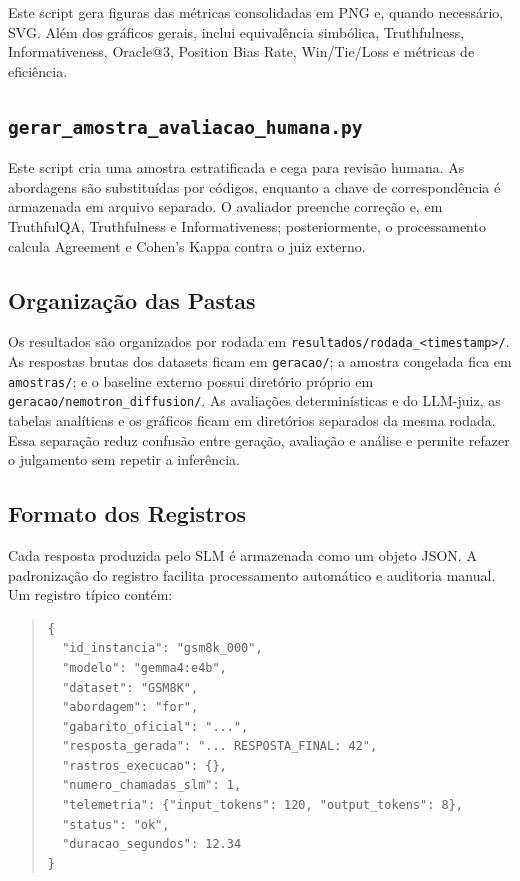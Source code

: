 \documentclass[12pt]{article}
\begin{document}
Este script gera figuras das métricas consolidadas em PNG e, quando necessário, SVG. Além dos gráficos gerais, inclui equivalência simbólica, Truthfulness, Informativeness, Oracle@3, Position Bias Rate, Win/Tie/Loss e métricas de eficiência.

\subsection{\texttt{gerar\_amostra\_avaliacao\_humana.py}}

Este script cria uma amostra estratificada e cega para revisão humana. As abordagens são substituídas por códigos, enquanto a chave de correspondência é armazenada em arquivo separado. O avaliador preenche correção e, em TruthfulQA, Truthfulness e Informativeness; posteriormente, o processamento calcula Agreement e Cohen's Kappa contra o juiz externo.

\subsection{Organização das Pastas}

Os resultados são organizados por rodada em \texttt{resultados/rodada\_<timestamp>/}. As respostas brutas dos datasets ficam em \texttt{geracao/}; a amostra congelada fica em \texttt{amostras/}; e o baseline externo possui diretório próprio em \texttt{geracao/nemotron\_diffusion/}. As avaliações determinísticas e do LLM-juiz, as tabelas analíticas e os gráficos ficam em diretórios separados da mesma rodada. Essa separação reduz confusão entre geração, avaliação e análise e permite refazer o julgamento sem repetir a inferência.

\FloatBarrier
\subsection{Formato dos Registros}

Cada resposta produzida pelo SLM é armazenada como um objeto JSON. A padronização do registro facilita processamento automático e auditoria manual. Um registro típico contém:

\begin{quote}
\small
\begin{verbatim}
{
  "id_instancia": "gsm8k_000",
  "modelo": "gemma4:e4b",
  "dataset": "GSM8K",
  "abordagem": "for",
  "gabarito_oficial": "...",
  "resposta_gerada": "... RESPOSTA_FINAL: 42",
  "rastros_execucao": {},
  "numero_chamadas_slm": 1,
  "telemetria": {"input_tokens": 120, "output_tokens": 8},
  "status": "ok",
  "duracao_segundos": 12.34
}
\end{verbatim}
\end{quote}
\end{document}

